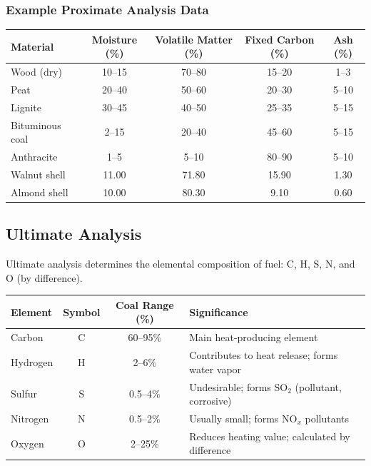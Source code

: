 \documentclass[12pt,a4paper]{article}
\begin{document}
\subsubsection{Example Proximate Analysis Data}
\begin{center}
\renewcommand{\arraystretch}{1.4}
\begin{tabular}{|l|c|c|c|c|}
\hline
\textbf{Material} & \textbf{Moisture (\%)} & \textbf{Volatile Matter (\%)} & \textbf{Fixed Carbon (\%)} & \textbf{Ash (\%)} \\
\hline
Wood (dry) & 10--15 & 70--80 & 15--20 & 1--3 \\
Peat & 20--40 & 50--60 & 20--30 & 5--10 \\
Lignite & 30--45 & 40--50 & 25--35 & 5--15 \\
Bituminous coal & 2--15 & 20--40 & 45--60 & 5--15 \\
Anthracite & 1--5 & 5--10 & 80--90 & 5--10 \\
Walnut shell & 11.00 & 71.80 & 15.90 & 1.30 \\
Almond shell & 10.00 & 80.30 & 9.10 & 0.60 \\
\hline
\end{tabular}
\end{center}

\subsection{Ultimate Analysis}
Ultimate analysis determines the elemental composition of fuel: C, H, S, N, and O (by difference).

\begin{center}
\renewcommand{\arraystretch}{1.4}
\begin{tabular}{|l|c|c|p{6cm}|}
\hline
\textbf{Element} & \textbf{Symbol} & \textbf{Coal Range (\%)} & \textbf{Significance} \\
\hline
Carbon & C & 60--95\% & Main heat-producing element \\
Hydrogen & H & 2--6\% & Contributes to heat release; forms water vapor \\
Sulfur & S & 0.5--4\% & Undesirable; forms $\text{SO}_2$ (pollutant, corrosive) \\
Nitrogen & N & 0.5--2\% & Usually small; forms $\text{NO}_x$ pollutants \\
Oxygen & O & 2--25\% & Reduces heating value; calculated by difference \\
\hline
\end{tabular}
\end{center}
\end{document}
